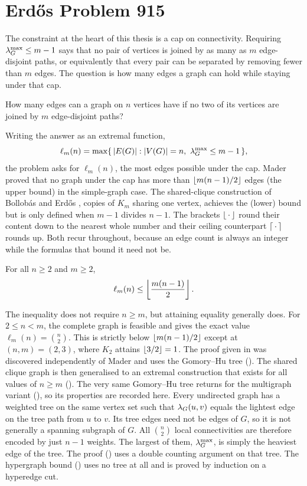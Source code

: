 \section{Erd\H{o}s Problem 915}

The constraint at the heart of this thesis is a cap on connectivity.
Requiring $\lambda_G^{\max} \le m - 1$ says that no pair of vertices is joined by as many as $m$ edge-disjoint paths, or equivalently that every pair can be separated by removing fewer than $m$ edges.
The question is how many edges a graph can hold while staying under that cap.

\begin{ques}
How many edges can a graph on $n$ vertices have if no two of its vertices are joined by $m$ edge-disjoint paths?
\end{ques}

Writing the answer as an extremal function,
\[
    \ell_m(n) = \max\{\, |E(G)| : |V(G)| = n,\ \lec_G^{\max} \le m - 1 \,\},
\]
the problem asks for $\ell_m(n)$, the most edges possible under the cap.
Mader proved that no graph under the cap has more than $\left\lfloor m(n-1)/2 \right\rfloor$ edges (the upper bound) in the simple-graph case. The shared-clique construction of Bollob\'{a}s and Erd\H{o}s \cite{BollobasErdos62}, copies of $K_m$ sharing one vertex, achieves the (lower) bound but is only defined when $m-1$ divides $n-1$.
The brackets $\left\lfloor \,\cdot\, \right\rfloor$ round their content down to the nearest whole number and their ceiling counterpart $\left\lceil \,\cdot\, \right\rceil$ rounds up. Both recur throughout, because an edge count is always an integer while the formulas that bound it need not be.

\begin{theorem}\label{thm:mader}
For all $n \ge 2$ and $m \ge 2$,
\[
    \ell_m(n) \le \left\lfloor \frac{m(n-1)}{2} \right\rfloor.
\]
\end{theorem}

The inequality does not require $n \ge m$, but attaining equality generally does. For $2\le n<m$, the complete graph is feasible and gives the exact value $\ell_m(n)=\binom{n}{2}$. This is strictly below $\left\lfloor m(n-1)/2 \right\rfloor$ except at $(n,m)=(2,3)$, where $K_2$ attains $\left\lfloor 3/2 \right\rfloor=1$.
The proof given in  was discovered independently of Mader and uses the Gomory--Hu tree ().
The shared clique graph is then generalised to an extremal construction that exists for all values of $n\ge m$ ().
The very same Gomory--Hu tree returns for the multigraph variant (), so its properties are recorded here.
Every undirected graph has a weighted tree on the same vertex set such that $\lambda_G(u, v)$ equals the lightest edge on the tree path from $u$ to $v$.
Its tree edges need not be edges of $G$, so it is not generally a spanning subgraph of $G$.
All $\binom{n}{2}$ local connectivities are therefore encoded by just $n - 1$ weights.
The largest of them, $\lambda_G^{\max}$, is simply the heaviest edge of the tree.
The proof () uses a double counting argument on that tree.
The hypergraph bound () uses no tree at all and is proved by induction on a hyperedge cut.

